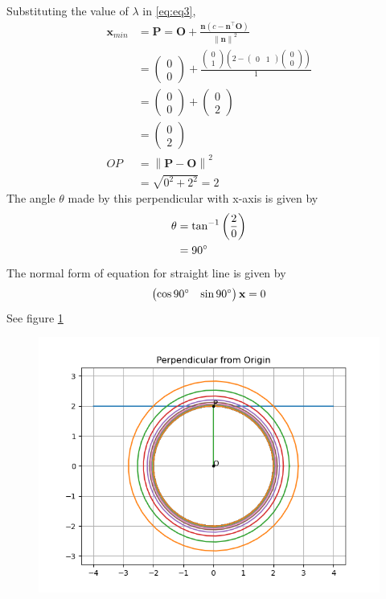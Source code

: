 \documentclass[12pt]{article}
\providecommand{\brak}[1]{\ensuremath{\left(#1\right)}}
\providecommand{\norm}[1]{\left\lVert#1\right\rVert}
\newcommand{\myvec}[1]{\ensuremath{\begin{pmatrix}#1\end{pmatrix}}}
\let\vec\mathbf
\begin{document}
Substituting the value of $\lambda$ in \eqref{eq:eq3},
\begin{align}
	\vec{x}_{min} &= \vec{P} = \vec{O}+\frac{\vec{n}\brak{c-\vec{n}^\top\vec{O}}}{\norm{\vec{n}}^2}\\
	&= \myvec{0\\0}+ \frac{\myvec{0\\1}\brak{2-\myvec{0&1}\myvec{0\\0}}}{1}\\
	&= \myvec{0\\0}+\myvec{0\\2}\\
	&= \myvec{0\\2}\\
	OP &= \norm{\vec{P}-\vec{O}}^2\\
	&= \sqrt{0^2+2^2} = 2
\end{align}
The angle $\theta$ made by this perpendicular with x-axis is given by
\begin{align}
	\theta &= \tan^{-1}{\brak{\frac{2}{0}}}\\
	&= 90\degree
\end{align}
The normal form of equation for straight line is given by 
\begin{align}
	\myvec{\cos{90}\degree&\sin{90}\degree}\vec{x} = 0
\end{align}
See figure \ref{fig:Fig1}
\begin{figure}[!h]
	\begin{center} 
	    \includegraphics[width=\columnwidth]{figs/opt3}
	\end{center}
\caption{}
\label{fig:Fig1}
\end{figure}
\end{document}
